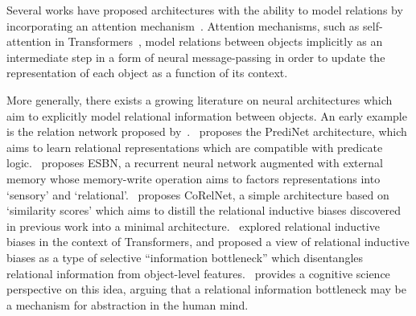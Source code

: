 Several works have proposed architectures with the ability to model relations by incorporating an {attention mechanism}~\citep{vaswani2017attention,locatelloObjectCentricLearningSlot2020,santoroRelationalRecurrent2018,zambaldiDeepReinforcementLearning2018,velickovicGraphAttentionNetworks2017}. Attention mechanisms, such as self-attention in Transformers~\citep{vaswani2017attention}, model relations between objects implicitly as an intermediate step in a form of neural message-passing in order to update the representation of each object as a function of its context.

More generally, there exists a growing literature on neural architectures which aim to explicitly model relational information between objects. An early example is the relation network proposed by~\citet{santoroSimpleNeural2017}.~\citet{shanahanExplicitlyRelationalNeural} proposes the PrediNet architecture, which aims to learn relational representations which are compatible with predicate logic.~\citet{webbEmergentSymbols2021} proposes ESBN, a recurrent neural network augmented with external memory whose memory-write operation aims to factors representations into `sensory' and `relational'.~\citet{kergNeuralArchitecture2022} proposes CoRelNet, a simple architecture based on `similarity scores' which aims to distill the relational inductive biases discovered in previous work into a minimal architecture.~\citet{altabaaAbstractorsTransformer2023} explored relational inductive biases in the context of Transformers, and proposed a view of relational inductive biases as a type of selective ``information bottleneck'' which disentangles relational information from object-level features.~\citet{webbRelationalBottleneckInductive2023} provides a cognitive science perspective on this idea, arguing that a relational information bottleneck may be a mechanism for abstraction in the human mind.%
